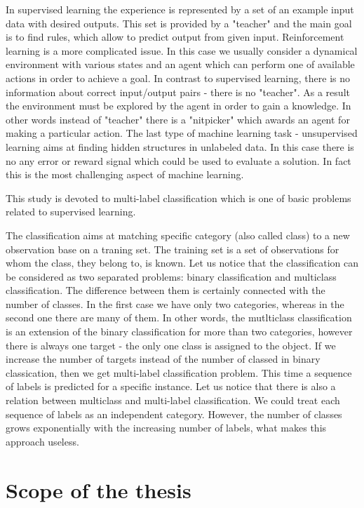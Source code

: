 In supervised learning the experience is represented by a set of an example input data with desired outputs. This set is provided by a "teacher" and the main goal is to find rules, which allow to predict output from given input. Reinforcement learning is a more complicated issue. In this case we usually consider a dynamical environment with various states and an agent which can perform one of available actions in order to achieve a goal. In contrast to supervised learning, there is no information about correct input/output pairs - there is no "teacher". As a result the environment must be explored by the agent in order to gain a knowledge. In other words instead of "teacher" there is a "nitpicker" which awards an agent for making a particular action. The last type of machine learning task - unsupervised learning aims at finding hidden structures in unlabeled data. In this case there is no any error or reward signal which could be used to evaluate a solution. In fact this is the most challenging aspect of machine learning. 

This study is devoted to multi-label classification which is one of basic problems related to supervised learning. 

The classification aims at matching specific category (also called class) to a new observation base on a traning set. The training set is a set of observations for whom the class, they belong to, is known. Let us notice that the classification can be considered as two separated problems: binary classification and multiclass classification. The difference between them is certainly connected with the number of classes. In the first case we have only two categories, whereas in the second one there are many of them. In other words, the mutlticlass classification is an extension of the binary classification for more than two categories, however there is always one target - the only one class is assigned to the object. If we increase the number of targets instead of the number of classed in binary classication, then we get multi-label classification problem. This time a sequence of labels is predicted for a specific instance. Let us notice that there is also a relation between multiclass and multi-label classification. We could treat each sequence of labels as an independent category. However, the number of classes grows exponentially with the increasing number of labels, what makes this approach useless. 

\section{Scope of the thesis}

